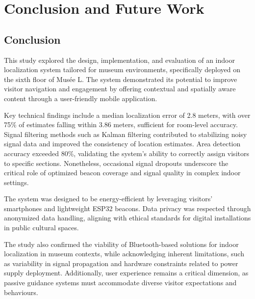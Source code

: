 



\chapter{Conclusion and Future Work}
\label{chap:conclusion}

\section{Conclusion}
This study explored the design, implementation, and evaluation of an indoor localization system tailored for museum environments, specifically deployed on the sixth floor of Musée L. The system demonstrated its potential to improve visitor navigation and engagement by offering contextual and spatially aware content through a user-friendly mobile application. 

Key technical findings include a median localization error of 2.8 meters, with over 75\% of estimates falling within 3.86 meters, sufficient for room-level accuracy. Signal filtering methods such as Kalman filtering contributed to stabilizing noisy signal data and improved the consistency of location estimates. Area detection accuracy exceeded 80\%, validating the system’s ability to correctly assign visitors to specific sections. Nonetheless, occasional signal dropouts underscore the critical role of optimized beacon coverage and signal quality in complex indoor settings. 

The system was designed to be energy-efficient by leveraging visitors’ smartphones and lightweight ESP32 beacons. Data privacy was respected through anonymized data handling, aligning with ethical standards for digital installations in public cultural spaces. 

The study also confirmed the viability of Bluetooth-based solutions for indoor localization in museum contexts, while acknowledging inherent limitations, such as variability in signal propagation and hardware constraints related to power supply deployment. Additionally, user experience remains a critical dimension, as passive guidance systems must accommodate diverse visitor expectations and behaviours. 

